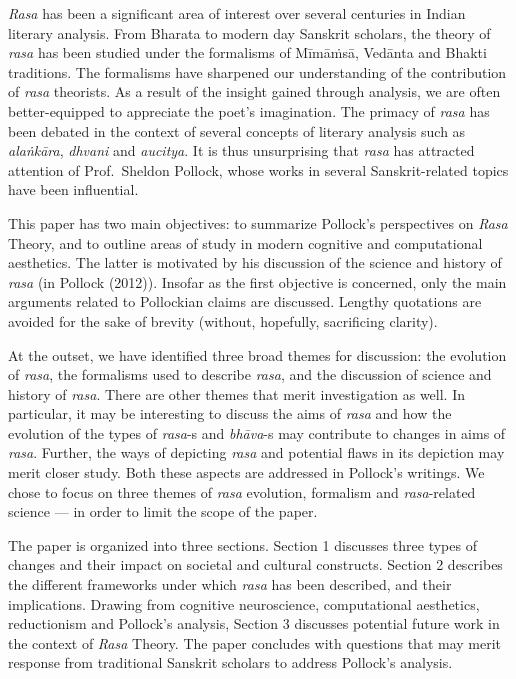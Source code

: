 \textsl{Rasa} has been a significant area of interest over several centuries in Indian literary analysis. From Bharata to modern day Sanskrit scholars, the theory of \textsl{rasa} has been studied under the formalisms of Mīmāṁsā, Vedānta and Bhakti traditions. The formalisms have sharpened our understanding of the contribution of \textsl{rasa} theorists. As a result of the insight gained through analysis, we are often better-equipped to appreciate the poet’s imagination. The primacy of \textsl{rasa} has been debated in the context of several concepts of literary analysis such as \textsl{alaṅkāra}, \textsl{dhvani} and \textsl{aucitya}. It is thus unsurprising that \textsl{rasa} has attracted attention of Prof.\ Sheldon Pollock, whose works in several Sanskrit-related topics have been influential. 

This paper has two main objectives: to summarize Pollock’s perspectives on \textsl{Rasa} Theory, and to outline areas of study in modern cognitive and computational aesthetics. The latter is motivated by his discussion of the science and history of \textsl{rasa} (in Pollock (2012)). Insofar as the first objective is concerned, only the main arguments related to Pollockian claims are discussed. Lengthy quotations are avoided for the sake of brevity (without, hopefully, sacrificing clarity). 

At the outset, we have identified three broad themes for discussion: the evolution of \textsl{rasa}, the formalisms used to describe \textsl{rasa}, and the discussion of science and history of \textsl{rasa}. There are other themes that merit investigation as well. In particular, it may be interesting to discuss the aims of \textsl{rasa} and how the evolution of the types of \hbox{\textsl{rasa}-s} and \textsl{bhāva}-s may contribute to changes in aims of \textsl{rasa}. Further, the ways of depicting \textsl{rasa} and potential flaws in its depiction may merit closer study. Both these aspects are addressed in Pollock’s writings. We chose to focus on three themes of \textsl{rasa} evolution, formalism and \textsl{rasa}-related science --- in order to limit the scope of the paper. 

The paper is organized into three sections. Section 1 discusses three types of changes and their impact on societal and cultural constructs. Section 2 describes the different frameworks under which \textsl{rasa} has been described, and their implications. Drawing from cognitive neuroscience, computational aesthetics, reductionism and Pollock’s analysis, Section 3 discusses potential future work in the context of \textsl{Rasa} Theory. The paper concludes with questions that may merit response from traditional Sanskrit scholars to address Pollock’s analysis.\\[-20pt]

